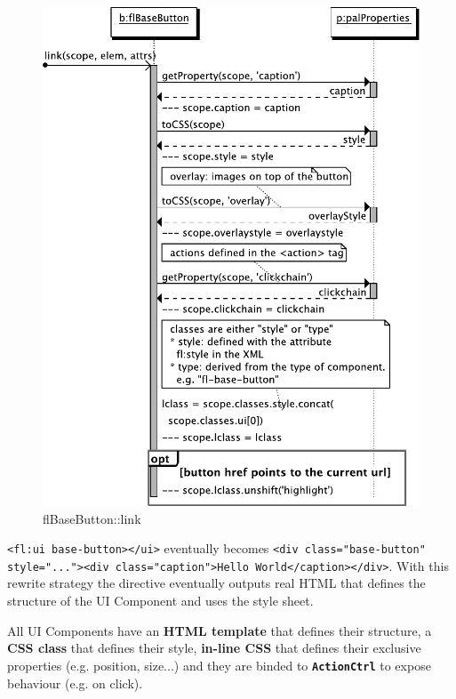 \begin{figure}[htb]
    \centering
    \includegraphics{figures/design/seqdia/basebutton-link.pdf}
    \caption{flBaseButton::link}
    \label{fig:design-seqdia-basebutton-link}
\end{figure}

\lstinline$<fl:ui base-button></ui>$ eventually becomes \lstinline$<div class="base-button" style="..."><div class="caption">Hello World</caption></div>$. 
With this rewrite strategy the directive eventually outputs real \ac{HTML} that defines the structure of the UI Component and uses the style sheet.

All UI Components have an  \textbf{\ac{HTML} template} that defines their structure, a \textbf{\ac{CSS} class} that defines their style, \textbf{in-line \ac{CSS}} that defines their exclusive properties (e.g. position, size...) and they are binded to \textbf{\texttt{ActionCtrl}} to expose behaviour (e.g. on click).
\FloatBarrier

